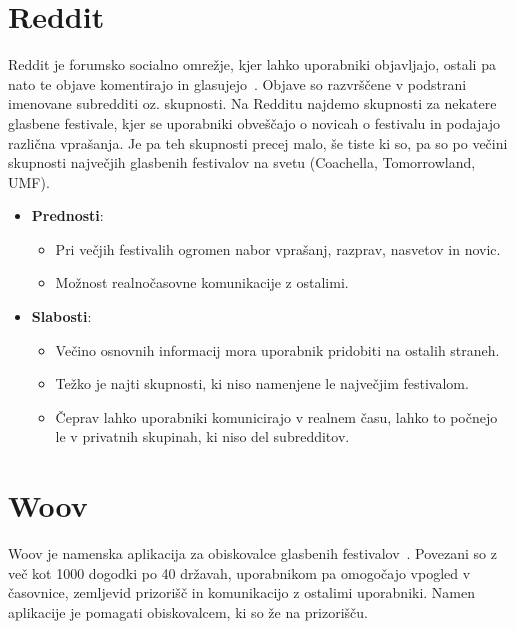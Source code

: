 \documentclass[a4paper,12pt,openright]{book}
\begin{document}
\section{Reddit}
Reddit je forumsko socialno omrežje, kjer lahko uporabniki objavljajo, ostali pa nato te objave komentirajo in glasujejo~\cite{reddit}. Objave so razvrščene v podstrani imenovane subredditi oz. skupnosti.
Na Redditu najdemo skupnosti za nekatere glasbene festivale, kjer se uporabniki obveščajo o novicah o festivalu in podajajo različna vprašanja. Je pa teh skupnosti precej malo, še tiste ki so, 
pa so po večini skupnosti največjih glasbenih festivalov na svetu (Coachella, Tomorrowland, UMF).

\begin{itemize}
    \item \textbf{Prednosti}:
        \begin{itemize}
            \item Pri večjih festivalih ogromen nabor vprašanj, razprav, nasvetov in novic.
            \item Možnost realnočasovne komunikacije z ostalimi.
        \end{itemize}
    \item \textbf{Slabosti}:
        \begin{itemize}
            \item Večino osnovnih informacij mora uporabnik pridobiti na ostalih straneh.
            \item Težko je najti skupnosti, ki niso namenjene le največjim festivalom.
            \item Čeprav lahko uporabniki komunicirajo v realnem času, lahko to počnejo le v privatnih skupinah, ki niso del subredditov.
        \end{itemize}
\end{itemize}

\section{Woov}
Woov je namenska aplikacija za obiskovalce glasbenih festivalov~\cite{woov}. Povezani so z več kot 1000 dogodki po 40 državah, uporabnikom pa omogočajo vpogled v časovnice, zemljevid prizorišč in komunikacijo z ostalimi uporabniki.
Namen aplikacije je pomagati obiskovalcem, ki so že na prizorišču.
\end{document}
